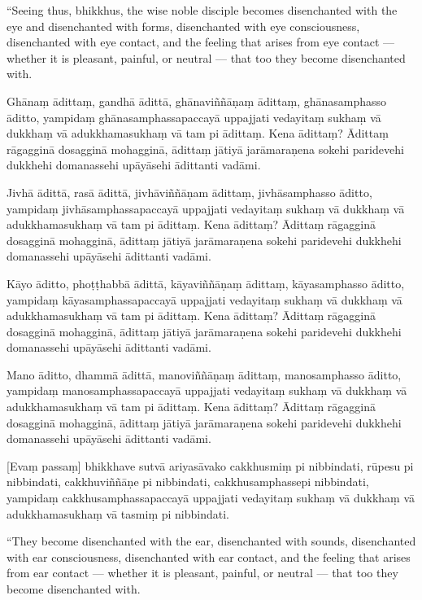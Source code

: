 ``Seeing thus, bhikkhus, the wise noble disciple becomes disenchanted
with the eye and disenchanted with forms, disenchanted with eye
consciousness, disenchanted with eye contact, and the feeling that
arises from eye contact --- whether it is pleasant, painful, or
neutral --- that too they become disenchanted with.

\clearpage

\paliText

Ghānaṃ ādittaṃ, gandhā ādittā, ghānaviññāṇaṃ ādittaṃ, ghānasamphasso
āditto, yampidaṃ ghānasamphassapaccayā uppajjati vedayitaṃ sukhaṃ vā
dukkhaṃ vā adukkhamasukhaṃ vā tam pi ādittaṃ. Kena ādittaṃ? Ādittaṃ
rāgagginā dosagginā mohagginā, ādittaṃ jātiyā jarāmaraṇena sokehi
paridevehi dukkhehi domanassehi upāyāsehi ādittanti vadāmi.

Jivhā ādittā, rasā ādittā, jivhāviññāṇam ādittaṃ, jivhāsamphasso āditto,
yampidaṃ jivhāsamphassapaccayā uppajjati vedayitaṃ sukhaṃ vā dukkhaṃ vā
adukkhamasukhaṃ vā tam pi ādittaṃ. Kena ādittaṃ? Ādittaṃ rāgagginā
dosagginā mohagginā, ādittaṃ jātiyā jarāmaraṇena sokehi paridevehi
dukkhehi domanassehi upāyāsehi ādittanti vadāmi.

Kāyo āditto, phoṭṭhabbā ādittā, kāyaviññāṇaṃ ādittaṃ, kāyasamphasso
āditto, yampidaṃ kāyasamphassapaccayā uppajjati vedayitaṃ sukhaṃ vā
dukkhaṃ vā adukkhamasukhaṃ vā tam pi ādittaṃ. Kena ādittaṃ? Ādittaṃ
rāgagginā dosagginā mohagginā, ādittaṃ jātiyā jarāmaraṇena sokehi
paridevehi dukkhehi domanassehi upāyāsehi ādittanti vadāmi.

Mano āditto, dhammā ādittā, manoviññāṇaṃ ādittaṃ, manosamphasso āditto,
yampidaṃ manosamphassapaccayā uppajjati vedayitaṃ sukhaṃ vā dukkhaṃ vā
adukkhamasukhaṃ vā tam pi ādittaṃ. Kena ādittaṃ? Ādittaṃ rāgagginā
dosagginā mohagginā, ādittaṃ jātiyā jarāmaraṇena sokehi paridevehi
dukkhehi domanassehi upāyāsehi ādittanti vadāmi.

\enlargethispage{2\baselineskip}

[Evaṃ passaṃ] bhikkhave sutvā ariyasāvako cakkhusmiṃ pi nibbindati,
rūpesu pi nibbindati, cakkhuviññāṇe pi nibbindati, cakkhusamphassepi
nibbindati, yampidaṃ cakkhusamphassapaccayā uppajjati vedayitaṃ sukhaṃ
vā dukkhaṃ vā adukkhamasukhaṃ vā tasmiṃ pi nibbindati.

\clearpage

\englishText

``They become disenchanted with the ear, disenchanted with sounds,
disenchanted with ear consciousness, disenchanted with ear contact, and
the feeling that arises from ear contact --- whether it is pleasant,
painful, or neutral --- that too they become disenchanted with.

